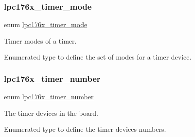 \subsubsection{\texorpdfstring{lpc176x\_timer\_mode}{lpc176x\_timer\_mode}}
{\footnotesize\ttfamily enum \mbox{\hyperlink{timer-defs_8h_ab87d5565db3afd3f1ad7b2762ab600b9}{lpc176x\+\_\+timer\+\_\+mode}}}



Timer modes of a timer. 

Enumerated type to define the set of modes for a timer device. \mbox{\label{timer-defs_8h_a23c6cc7925b3e04973ecb1cc9f3706d1}} 
\subsubsection{\texorpdfstring{lpc176x\_timer\_number}{lpc176x\_timer\_number}}
{\footnotesize\ttfamily enum \mbox{\hyperlink{timer-defs_8h_a23c6cc7925b3e04973ecb1cc9f3706d1}{lpc176x\+\_\+timer\+\_\+number}}}



The timer devices in the board. 

Enumerated type to define the timer device\textquotesingle{}s numbers. 